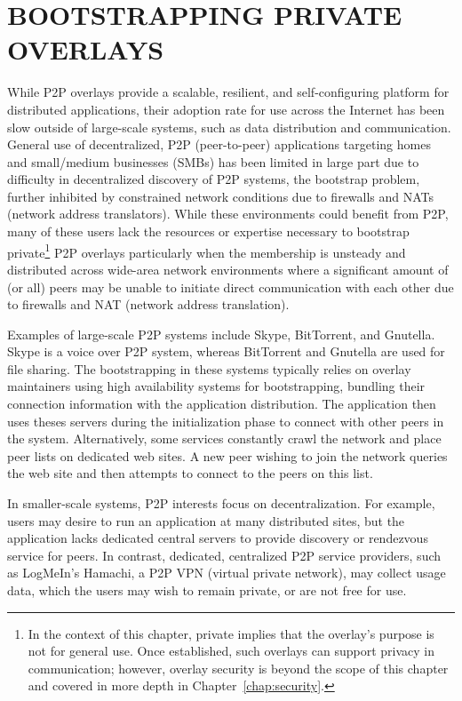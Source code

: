 \chapter{BOOTSTRAPPING PRIVATE OVERLAYS}
\label{chap:bootstrapping}

While P2P overlays provide a scalable, resilient, and self-configuring platform
for distributed applications, their adoption rate for use across the Internet
has been slow outside of large-scale systems, such as data distribution and
communication.  General use of decentralized, P2P (peer-to-peer) applications
targeting homes and small/medium businesses (SMBs) has been limited in large
part due to difficulty in decentralized discovery of P2P systems, the bootstrap
problem, further inhibited by constrained network conditions due to firewalls
and NATs (network address translators).  While these environments could benefit
from P2P, many of these users lack the resources or expertise necessary to
bootstrap private\footnote{In the context of this chapter, private implies that
the overlay's purpose is not for general use. Once established, such overlays
can support privacy in communication; however, overlay security is beyond the
scope of this chapter and covered in more depth in
Chapter~\ref{chap:security}.} P2P overlays particularly when the membership is
unsteady and distributed across wide-area network environments where a
significant amount of (or all) peers may be unable to initiate direct
communication with each other due to firewalls and NAT (network address
translation).

Examples of large-scale P2P systems include Skype, BitTorrent, and Gnutella.
Skype is a voice over P2P system, whereas BitTorrent and Gnutella are used for
file sharing.  The bootstrapping in these systems typically relies on overlay
maintainers using high availability systems for bootstrapping, bundling their
connection information with the application distribution.  The application then
uses theses servers during the initialization phase to connect with other peers
in the system.  Alternatively, some services constantly crawl the network and
place peer lists on dedicated web sites. A new peer wishing to join the network
queries the web site and then attempts to connect to the peers on this list.

In smaller-scale systems, P2P interests focus on decentralization.  For
example, users may desire to run an application at many distributed sites, but
the application lacks dedicated central servers to provide discovery or
rendezvous service for peers.  In contrast, dedicated, centralized P2P service
providers, such as LogMeIn's Hamachi, a P2P VPN (virtual private network), may
collect usage data, which the users may wish to remain private, or are not free
for use.


